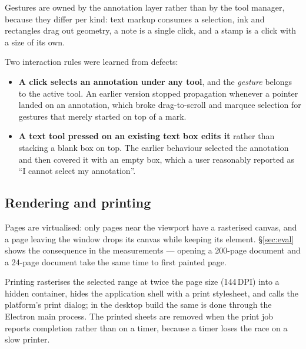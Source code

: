 Gestures are owned by the annotation layer rather than by the tool manager, because they
differ per kind: text markup consumes a selection, ink and rectangles drag out geometry, a
note is a single click, and a stamp is a click with a size of its own.

Two interaction rules were learned from defects:

\begin{itemize}
  \item \textbf{A click selects an annotation under any tool}, and the \emph{gesture} belongs
        to the active tool. An earlier version stopped propagation whenever a pointer landed on
        an annotation, which broke drag-to-scroll and marquee selection for gestures that
        merely started on top of a mark.
  \item \textbf{A text tool pressed on an existing text box edits it} rather than stacking a
        blank box on top. The earlier behaviour selected the annotation and then covered it with
        an empty box, which a user reasonably reported as ``I cannot select my annotation''.
\end{itemize}

\subsection{Rendering and printing}

Pages are virtualised: only pages near the viewport have a rasterised canvas, and a page
leaving the window drops its canvas while keeping its element. \S\ref{sec:eval} shows the
consequence in the measurements --- opening a 200-page document and a 24-page document take
the same time to first painted page.

Printing rasterises the selected range at twice the page size (144\,DPI) into a hidden
container, hides the application shell with a print stylesheet, and calls the platform's print
dialog; in the desktop build the same is done through the Electron main process. The printed
sheets are removed when the print job reports completion rather than on a timer, because a
timer loses the race on a slow printer.

